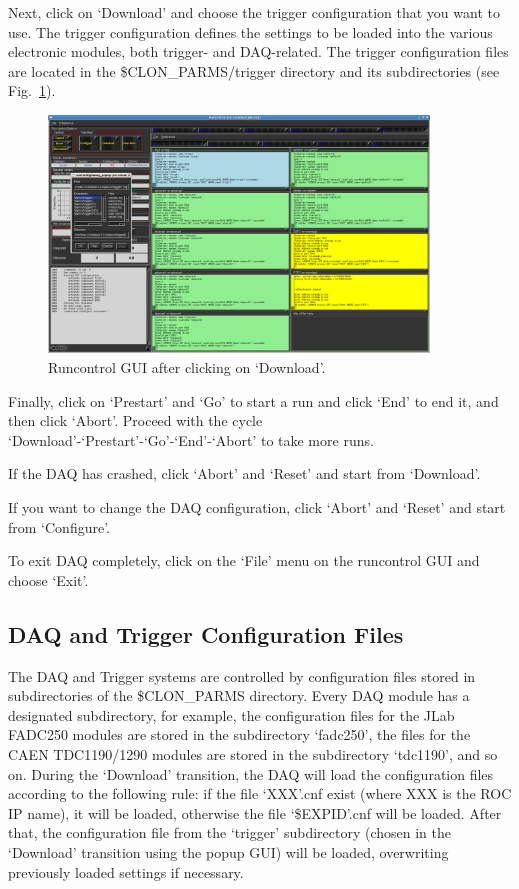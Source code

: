 Next, click on `Download' and choose the trigger configuration that you want to
use. The trigger configuration defines the settings to be loaded into the various
electronic modules, both trigger- and DAQ-related. The trigger configuration files 
are located in the \$CLON\_PARMS/trigger directory and its subdirectories (see 
Fig.~\ref{fig:runcontrol4}).

\begin{figure}[ht]
\centering
\includegraphics[width=0.9\textwidth]{runcontrol4.png}
\caption{\small{Runcontrol GUI after clicking on `Download'.}}
\label{fig:runcontrol4} 
\end{figure}

Finally, click on `Prestart' and `Go' to start a run and click `End'
to end it, and then click `Abort'. Proceed with the cycle
`Download'-`Prestart'-`Go'-`End'-`Abort' to take more runs.


If the DAQ has crashed, click `Abort' and `Reset' and start from `Download'.

If you want to change the DAQ configuration, click `Abort' and `Reset' and
start from `Configure'.

To exit DAQ completely, click on the `File' menu on the runcontrol GUI and
choose `Exit'.

\subsection{DAQ and Trigger Configuration Files}

The DAQ and Trigger systems are controlled by configuration files stored in
subdirectories of the \$CLON\_PARMS directory. Every DAQ module has a
designated subdirectory, for example, the configuration files for the JLab 
FADC250 modules are stored in the subdirectory `fadc250', the files for the 
CAEN TDC1190/1290 modules are stored in the subdirectory `tdc1190', and so on. 
During the `Download' transition, the DAQ will load the configuration files 
according to the following rule: if the file `XXX'.cnf exist (where XXX is the 
ROC IP name), it will be loaded, otherwise the file `\$EXPID'.cnf will be loaded. 
After that, the configuration file from the `trigger' subdirectory (chosen in the
`Download' transition using the popup GUI) will be loaded, overwriting previously 
loaded settings if necessary.



\clearpage
